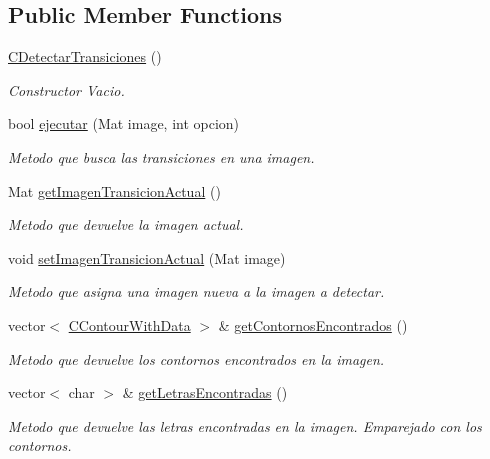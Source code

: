 \subsection*{Public Member Functions}
\begin{DoxyCompactItemize}
\item 
\hyperlink{classCDetectarTransiciones_a99c333a4c8c5a4bb0e03ac09ab6e50b9}{C\+Detectar\+Transiciones} ()
\begin{DoxyCompactList}\small\item\em Constructor Vacio. \end{DoxyCompactList}\item 
bool \hyperlink{classCDetectarTransiciones_af45b603eb94d26f2ce7becbe7391396e}{ejecutar} (Mat image, int opcion)
\begin{DoxyCompactList}\small\item\em Metodo que busca las transiciones en una imagen. \end{DoxyCompactList}\item 
Mat \hyperlink{classCDetectarTransiciones_aa9cea5befc08385a46baf86adc305737}{get\+Imagen\+Transicion\+Actual} ()
\begin{DoxyCompactList}\small\item\em Metodo que devuelve la imagen actual. \end{DoxyCompactList}\item 
void \hyperlink{classCDetectarTransiciones_a9f341c8df22490d46b266844b16f8585}{set\+Imagen\+Transicion\+Actual} (Mat image)
\begin{DoxyCompactList}\small\item\em Metodo que asigna una imagen nueva a la imagen a detectar. \end{DoxyCompactList}\item 
vector$<$ \hyperlink{classCContourWithData}{C\+Contour\+With\+Data} $>$ \& \hyperlink{classCDetectarTransiciones_a729c3aaffe2cc888e62c81a58814c1e9}{get\+Contornos\+Encontrados} ()
\begin{DoxyCompactList}\small\item\em Metodo que devuelve los contornos encontrados en la imagen. \end{DoxyCompactList}\item 
vector$<$ char $>$ \& \hyperlink{classCDetectarTransiciones_a1e7c9eac75874737cf7a2b7d7a4375c7}{get\+Letras\+Encontradas} ()
\begin{DoxyCompactList}\small\item\em Metodo que devuelve las letras encontradas en la imagen. Emparejado con los contornos. \end{DoxyCompactList}\end{DoxyCompactItemize}
